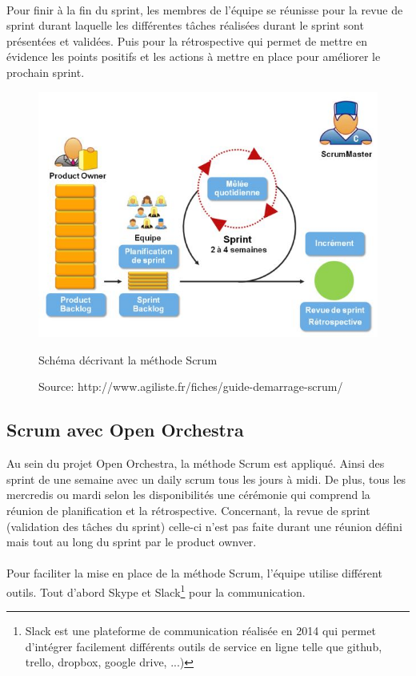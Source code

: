  \paragraph{}
Pour finir à la fin du sprint, les membres de l'équipe se réunisse pour la revue de sprint durant laquelle les différentes tâches réalisées durant le sprint sont présentées et validées. Puis pour la rétrospective qui permet de mettre en évidence les points positifs et les actions à mettre en place pour améliorer le prochain sprint.

\begin{figure}[H]
  \begin{center}
    \includegraphics[scale=0.75]{images/scrum}
  \end{center}
  \caption{Schéma décrivant la méthode Scrum}
  \caption*{Source: http://www.agiliste.fr/fiches/guide-demarrage-scrum/}
  \label{scrum}
\end{figure}

\subsection{Scrum avec Open Orchestra}
Au sein du projet Open Orchestra, la méthode Scrum est appliqué. Ainsi des sprint de une semaine avec un daily scrum tous les jours à midi.
De plus, tous les mercredis ou mardi selon les disponibilités une \og cérémonie \fg{} qui comprend la réunion de planification et la rétrospective.
Concernant, la revue de sprint (validation des tâches du sprint) celle-ci n'est pas faite durant une réunion défini mais tout au long du sprint par le product ownver.
 \paragraph{}
 Pour faciliter la mise en place de la méthode Scrum, l'équipe utilise différent outils.
 Tout d'abord Skype et Slack\footnote{Slack est une plateforme de communication réalisée en 2014 qui permet d'intégrer facilement différents outils de service en ligne telle que github, trello, dropbox, google drive, ...)} pour la communication.
